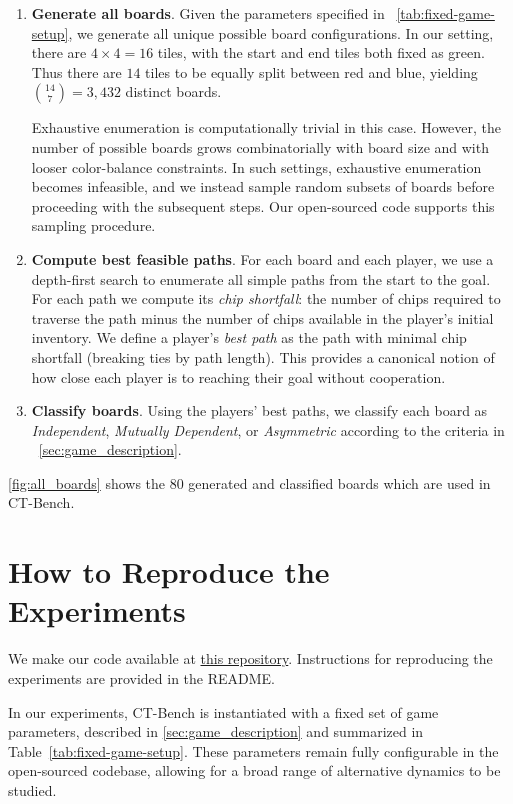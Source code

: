 \documentclass{article} %
\newcommand{\CT}{CT-Bench\xspace}
\begin{document}
\begin{enumerate}
    \item \textbf{Generate all boards}. Given the parameters specified in ~\cref{tab:fixed-game-setup}, we generate all unique possible board configurations. In our setting, there are $4 \times 4 = 16$ tiles, with the start and end tiles both fixed as green. Thus there are $14$ tiles to be equally split between red and blue, yielding \( \binom{14}{7} = 3{,}432 \) distinct boards. 
    
    Exhaustive enumeration is computationally trivial in this case. However, the number of possible boards grows combinatorially with board size and with looser color-balance constraints. In such settings, exhaustive enumeration becomes infeasible, and we instead sample random subsets of boards before proceeding with the subsequent steps. Our open-sourced code supports this sampling procedure. 

    \item \textbf{Compute best feasible paths}. For each board and each player, we use a depth-first search to enumerate all simple paths from the start to the goal. For each path we compute its \emph{chip shortfall}: the number of chips required to traverse the path minus the number of chips available in the player’s initial inventory. We define a player’s \emph{best path} as the path with minimal chip shortfall (breaking ties by path length). This provides a canonical notion of how close each player is to reaching their goal without cooperation.

    \item \textbf{Classify boards}. Using the players’ best paths, we classify each board as \textit{Independent}, \textit{Mutually Dependent}, or \textit{Asymmetric} according to the criteria in ~\cref{sec:game_description}.
\end{enumerate}
\cref{fig:all_boards} shows the $80$ generated and classified boards which are used in \CT.



\section{How to Reproduce the Experiments}
\label{appendix:reproduce}
We make our code available at \href{https://anonymous.4open.science/r/colored_trails-70A4}{this repository}. Instructions for reproducing the experiments are provided in the README.

In our experiments, \CT is instantiated with a fixed set of game parameters, described in \cref{sec:game_description} and summarized in Table~\ref{tab:fixed-game-setup}. 
These parameters remain fully configurable in the open-sourced codebase, allowing for a broad range of alternative dynamics to be studied.
\end{document}
